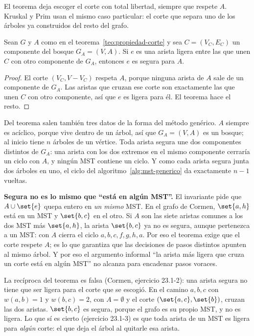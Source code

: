 \documentclass[11pt,letterpaper]{article}
\begin{document}
El teorema deja escoger el corte con total libertad, siempre que
respete $A$. Kruskal y Prim usan el mismo caso particular: el corte
que separa uno de los árboles ya construidos del resto del grafo.

\begin{corolario}
  \label{cor:mst-componente}
  Sean $G$ y $A$ como en el teorema~\ref{teo:propiedad-corte} y sea
  $C = (V_C, E_C)$ un componente del bosque $G_A = (V, A)$. Si $e$ es
  una arista ligera entre las que unen $C$ con otro componente de
  $G_A$, entonces $e$ es segura para $A$.
\end{corolario}

\begin{proof}
  El corte $(V_C, V - V_C)$ respeta $A$, porque ninguna arista de $A$
  sale de un componente de $G_A$. Las aristas que cruzan ese corte son
  exactamente las que unen $C$ con otro componente, así que $e$ es
  ligera para él. El teorema hace el resto.
\end{proof}

Del teorema salen también tres datos de la forma del método genérico.
$A$ siempre es acíclico, porque vive dentro de un árbol, así que
$G_A = (V, A)$ es un bosque; al inicio tiene $n$ árboles de un
vértice. Toda arista segura une dos componentes distintos de $G_A$:
una arista con los dos extremos en el mismo componente cerraría un
ciclo con $A$, y ningún MST contiene un ciclo. Y como cada arista
segura junta dos árboles en uno, el ciclo del
algoritmo~\ref{alg:mst-generico} da exactamente $n - 1$ vueltas.

\begin{ojo}
  \textbf{Segura no es lo mismo que ``está en algún MST''.} El
  invariante pide que $A \cup \set{e}$ quepa entero en \emph{un mismo}
  MST. En el grafo de Cormen, $\set{a,h}$ está en un MST y
  $\set{b,c}$ en el otro. Si $A$ son las siete aristas comunes a los
  dos MST más $\set{a,h}$, la arista $\set{b,c}$ ya no es segura,
  aunque pertenezca a un MST: con $A$ cierra el ciclo
  $a, b, c, f, g, h, a$. Por eso el teorema exige que el corte respete
  $A$; es lo que garantiza que las decisiones de pasos distintos
  apunten al mismo árbol. Y por eso el argumento informal ``la arista
  más ligera que cruza un corte está en algún MST'' no alcanza para
  encadenar pasos voraces.
\end{ojo}

\begin{observacion}
  La recíproca del teorema es falsa (Cormen, ejercicio 23.1-2): una
  arista segura no tiene que ser ligera para el corte que se escogió.
  En el camino $a, b, c$ con $w(a,b) = 1$ y $w(b,c) = 2$, con
  $A = \emptyset$ y el corte $(\set{a, c}, \set{b})$, cruzan las dos
  aristas. $\set{b, c}$ es segura, porque el grafo es su propio MST, y
  no es ligera. Lo que sí es cierto (ejercicio 23.1-3) es que toda
  arista de un MST es ligera para \emph{algún} corte: el que deja el
  árbol al quitarle esa arista.
\end{observacion}
\end{document}
